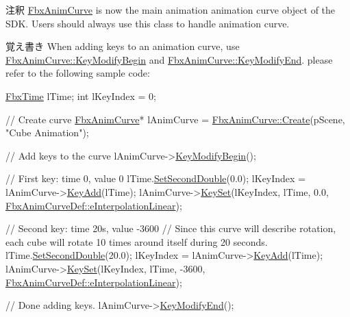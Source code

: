 \begin{DoxyRemark}{注釈}
\hyperlink{class_fbx_anim_curve}{Fbx\+Anim\+Curve} is now the main animation animation curve object of the S\+DK. Users should always use this class to handle animation curve.
\end{DoxyRemark}
\begin{DoxyNote}{覚え書き}
When adding keys to an animation curve, use \hyperlink{class_fbx_anim_curve_ac75a9aaa2edc08635c0a9fadbd628923}{Fbx\+Anim\+Curve\+::\+Key\+Modify\+Begin} and \hyperlink{class_fbx_anim_curve_ae8776e18ed1933e258774ba44f64fe5d}{Fbx\+Anim\+Curve\+::\+Key\+Modify\+End}. please refer to the following sample code\+: 
\begin{DoxyCode}
\hyperlink{class_fbx_time}{FbxTime} lTime;
\textcolor{keywordtype}{int} lKeyIndex = 0;

\textcolor{comment}{// Create curve}
\hyperlink{class_fbx_anim_curve}{FbxAnimCurve}* lAnimCurve = \hyperlink{class_fbx_anim_curve_ab0faf2c8c4a3d0fa8535da4a3eacb74a}{FbxAnimCurve::Create}(pScene, \textcolor{stringliteral}{"Cube Animation"});

\textcolor{comment}{// Add keys to the curve}
lAnimCurve->\hyperlink{class_fbx_anim_curve_ac75a9aaa2edc08635c0a9fadbd628923}{KeyModifyBegin}();

\textcolor{comment}{// First key: time 0, value 0}
lTime.\hyperlink{class_fbx_time_aa67980a4f73f7914d0c457384754da0c}{SetSecondDouble}(0.0);
lKeyIndex = lAnimCurve->\hyperlink{class_fbx_anim_curve_aefac9bf8a5d7bf1fe147e192ba503737}{KeyAdd}(lTime);
lAnimCurve->\hyperlink{class_fbx_anim_curve_a8f36f89bd5fbaa4f180789f4d9faf84f}{KeySet}(lKeyIndex, lTime, 0.0, 
      \hyperlink{class_fbx_anim_curve_def_add2ab7d10d856ab0868cc9b143d59ea5ab60e201b78e2105be1134c3c15519d20}{FbxAnimCurveDef::eInterpolationLinear});

\textcolor{comment}{// Second key: time 20s, value -3600}
\textcolor{comment}{// Since this curve will describe rotation, each cube will rotate 10 times around itself during 20 seconds.}
lTime.\hyperlink{class_fbx_time_aa67980a4f73f7914d0c457384754da0c}{SetSecondDouble}(20.0);
lKeyIndex = lAnimCurve->\hyperlink{class_fbx_anim_curve_aefac9bf8a5d7bf1fe147e192ba503737}{KeyAdd}(lTime);
lAnimCurve->\hyperlink{class_fbx_anim_curve_a8f36f89bd5fbaa4f180789f4d9faf84f}{KeySet}(lKeyIndex, lTime, -3600, 
      \hyperlink{class_fbx_anim_curve_def_add2ab7d10d856ab0868cc9b143d59ea5ab60e201b78e2105be1134c3c15519d20}{FbxAnimCurveDef::eInterpolationLinear});

\textcolor{comment}{// Done adding keys.}
lAnimCurve->\hyperlink{class_fbx_anim_curve_ae8776e18ed1933e258774ba44f64fe5d}{KeyModifyEnd}();
\end{DoxyCode}
 
\end{DoxyNote}


